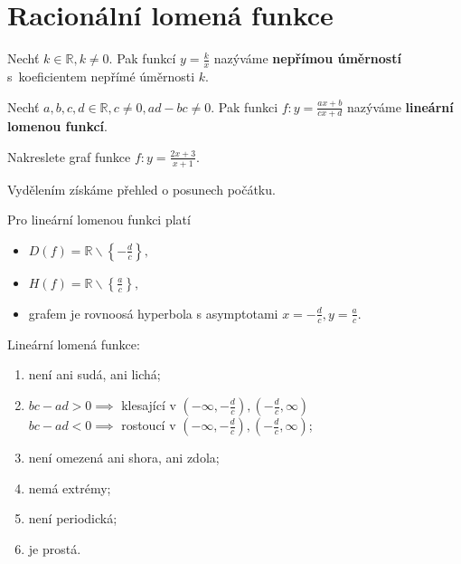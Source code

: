 \section{Racionální lomená funkce}
\begin{definition}
    Nechť $k \in \mathbb R, k \ne 0.$ Pak funkcí $y=\frac{k}{x}$
    nazýváme \textbf{nepřímou úměrností} s~koeficientem nepřímé úměrnosti $k$.
\end{definition}

\begin{definition}
    Nechť $a,b,c,d \in \mathbb R, c \ne 0, ad-bc \ne 0.$ Pak funkci
    $f:y=\frac{ax+b}{cx+d}$ nazýváme \textbf{lineární lomenou
    funkcí}.
\end{definition}

\begin{priklad}
Nakreslete graf funkce $f: y=\frac{2x+3}{x+1}.$
\end{priklad}

\begin{reseni}
Vydělením získáme přehled o posunech počátku.
\end{reseni}

\begin{pozn}
  Pro lineární lomenou funkci platí
  \begin{itemize}
      \item $D(f)=\mathbb R \smallsetminus \left \{ -\frac{d}{c} \right \},$
    	\item $H(f)=\mathbb R \smallsetminus \left \{ \frac{a}{c} \right \},$
     	\item grafem je rovnoosá hyperbola s asymptotami
      $x=-\frac{d}{c}, y=\frac{a}{c}.$
  \end{itemize}
\end{pozn}

\begin{veta}
    Lineární lomená funkce:
    \begin{enumerate}[$i.$]
        \item není ani sudá, ani lichá;
       	\item $bc-ad > 0 \implies$ klesající v
        $\left ( -\infty, -\frac{d}{c} \right ),
        \left ( -\frac{d}{c}, \infty \right ) $ \\
        $bc-ad < 0 \implies$ rostoucí v
        $\left ( -\infty, -\frac{d}{c} \right ),
        \left ( -\frac{d}{c}, \infty \right ) $;
       	\item není omezená ani shora, ani zdola;
       	\item nemá extrémy;
       	\item není periodická;
       	\item je prostá.
    \end{enumerate}
\end{veta}

